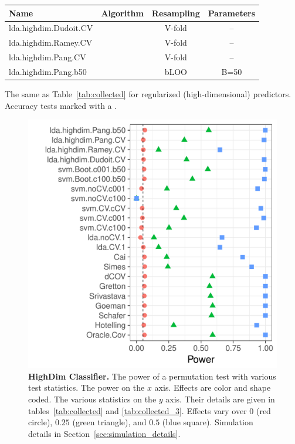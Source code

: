 \documentclass[]{bio}
\begin{document}
\begin{tcolorbox}
	\centering
	\footnotesize
	\begin{tabular}{l|c|c|c}
		Name & Algorithm & Resampling &  Parameters\\ 
		\hline
		\hline
		\cue lda.highdim.Dudoit.CV & \cite{dudoit_comparison_2002} & V-fold & -- \\ 
		\cue lda.highdim.Ramey.CV & \cite{ramey_high-dimensional_2016} & V-fold & -- \\ 
		\cue lda.highdim.Pang.CV & \cite{pang_shrinkage-based_2009} & V-fold & -- \\ 
		\cue lda.highdim.Pang.b50 & \cite{pang_shrinkage-based_2009} & bLOO 	 & B=50 \\ 
	\end{tabular} 
	\captionsetup{type=table}
	\caption{\footnotesize
		The same as Table~\ref{tab:collected} for regularized (high-dimensional) predictors. 
		Accuracy tests marked with a \cue.
	} 
	\label{tab:collected_3}
\end{tcolorbox}


\begin{figure}[ht]
	\centering
	\includegraphics[width=0.7\columnwidth]{"art/file14"}
	\caption{
		\textbf{HighDim Classifier.} 
		The power of a permutation test with various test statistics. 
		The power on the $x$ axis. 
		Effects are color and shape coded. 
		The various statistics on the $y$ axis. 
		Their details are given in tables~\ref{tab:collected} and \ref{tab:collected_3}. 
		Effects vary over $0$ (red circle), $0.25$ (green triangle), and $0.5$ (blue square). 
		Simulation details in Section~\ref{sec:simulation_details}.
	} 
	\label{fig:highdim}
\end{figure}
\end{document}

